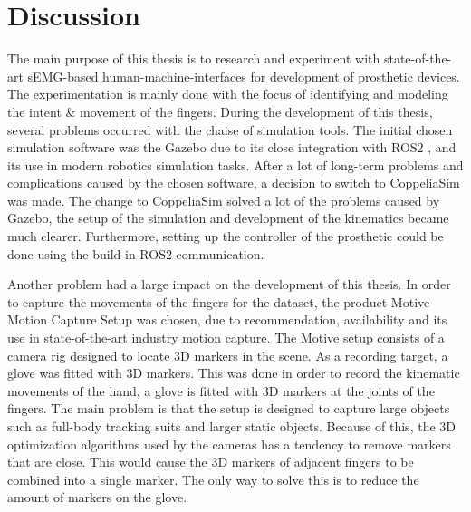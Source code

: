 \documentclass[../main.tex]{subfiles}
\begin{document}
\section{Discussion}

The main purpose of this thesis is to research and experiment with state-of-the-art sEMG-based human-machine-interfaces for development of prosthetic devices.
The experimentation is mainly done with the focus of identifying and modeling the intent \& movement of the fingers.
During the development of this thesis, several problems occurred with the chaise of simulation tools.
The initial chosen simulation software was the Gazebo \cite{gazebo} due to its close integration with ROS2 \cite{ros2}, and its use in modern robotics simulation tasks.
After a lot of long-term problems and complications caused by the chosen software, a decision to switch to CoppeliaSim \cite{coppeliasim} was made.
The change to CoppeliaSim solved a lot of the problems caused by Gazebo, the setup of the simulation and development of the kinematics became much clearer.
Furthermore, setting up the controller of the prosthetic could be done using the build-in ROS2 communication.

Another problem had a large impact on the development of this thesis.
In order to capture the movements of the fingers for the dataset, the product Motive Motion Capture Setup \cite{motive} was chosen, due to recommendation, availability and its use in state-of-the-art industry motion capture.
The Motive setup consists of a camera rig designed to locate 3D markers in the scene.
As a recording target, a glove was fitted with 3D markers.
This was done in order to record the kinematic movements of the hand, a glove is fitted with 3D markers at the joints of the fingers.
The main problem is that the setup is designed to capture large objects such as full-body tracking suits and larger static objects.
Because of this, the 3D optimization algorithms used by the cameras has a tendency to remove markers that are close. 
This would cause the 3D markers of adjacent fingers to be combined into a single marker.
The only way to solve this is to reduce the amount of markers on the glove.
\end{document}
